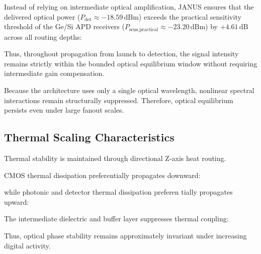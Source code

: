 \documentclass[journal]{IEEEtran}
\begin{document}
\begin{center}
\end{center}

Instead of relying on intermediate optical amplification, JANUS ensures that the delivered optical power ($P_{\text{det}} \approx -18.59\,\text{dBm}$) exceeds the practical sensitivity threshold of the Ge/Si APD receivers ($P_{\text{sens,practical}} \approx -23.20\,\text{dBm}$) by $+4.61\,\text{dB}$ across all routing depths:

\begin{center}
\end{center}

Thus, throughout propagation from launch to detection, the signal intensity remains strictly within the bounded optical equilibrium window without requiring intermediate gain compensation.

Because the architecture uses only a single optical wavelength, nonlinear spectral interactions remain structurally suppressed. Therefore, optical equilibrium persists even under large fanout scales.

\subsection{\textbf{Thermal Scaling Characteristics}}

Thermal stability is maintained through directional Z-axis heat routing.

CMOS thermal dissipation preferentially propagates downward:

\begin{center}
\end{center}

while photonic and detector thermal dissipation preferen tially propagates upward:

\begin{center}
\end{center}

The intermediate dielectric and buffer layer suppresses thermal coupling:

\begin{center}
\end{center}

Thus, optical phase stability remains approximately invariant under increasing digital activity.
\end{document}
